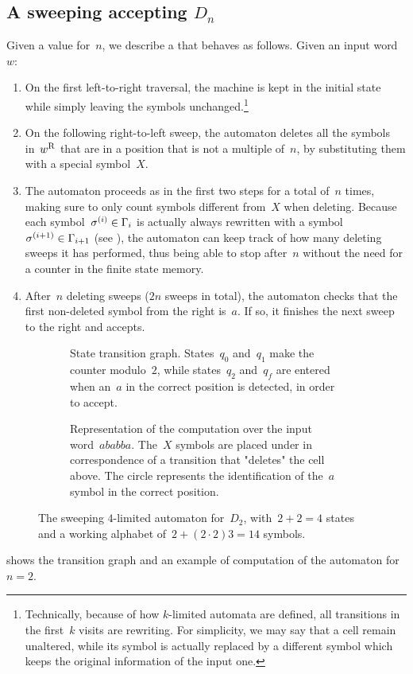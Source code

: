 \subsection{A sweeping \texorpdfstring{}{2n-DLA} accepting \texorpdfstring{$D_n$}{Ln}}
Given a value for~$n$, we describe a  that behaves as follows. Given an input word~$w$:
\begin{enumerate}
	\item On the first left-to-right traversal, the machine is kept in the initial state while simply leaving the symbols unchanged.\footnote{%
		      Technically, because of how $k$-limited automata are defined, all transitions in the first~$k$ visits are rewriting. For simplicity, we may say that a cell remain unaltered, while its symbol is actually replaced by a different symbol which keeps the original information of the input one.}
	\item On the following right-to-left sweep, the automaton deletes all the symbols in~$w^{\mathrm R}$ that are in a position that is not a multiple of~$n$, by substituting them with a special symbol~$X$.
	\item The automaton proceeds as in the first two steps for a total of~$n$ times, making sure to only count symbols different from~$X$ when deleting.
	      Because each symbol~$\sigma^{(i)}\in\Gamma_i$ is actually always rewritten with a symbol~$\sigma^{(i+1)}\in\Gamma_{i+1}$ (see ), the automaton can keep track of how many deleting sweeps it has performed, thus being able to stop after~$n$ without the need for a counter in the finite state memory.
	\item After~$n$ deleting sweeps ($2n$ sweeps in total), the automaton checks that the first non-deleted symbol from the right is~$a$.
	      If so, it finishes the next sweep to the right and accepts.
\end{enumerate}

\begin{figure}
	\centering
	\begin{subfigure}[b]{0.52\textwidth}
		\centering
		
		\caption{State transition graph.
			States~$q_0$ and~$q_1$ make the counter modulo~$2$, while states~$q_2$ and~$q_f$ are entered when an~$a$ in the correct position is detected, in order to accept.}
	\end{subfigure}
	\hfill
	\begin{subfigure}[b]{0.46\textwidth}
		\centering
		
		\caption{Representation of the computation over the input word~$ababba$.
			The~$X$ symbols are placed under in correspondence of a transition that "deletes" the cell above.
			The circle represents the identification of the~$a$ symbol in the correct position.}
	\end{subfigure}

	\caption[The sweeping $4$-limited automaton for~$D_2$ witnessing the lower bound for the gap between sweeping \kDLAs and \ONFAs.]{The sweeping $4$-limited automaton for~$D_2$, with~$2+2=4$ states and a working alphabet of~$2+(2\cdot2)3=14$ symbols.}
	\label{fig:sweepingDn}
\end{figure}
 shows the transition graph and an example of computation of the automaton for~$n=2$.

